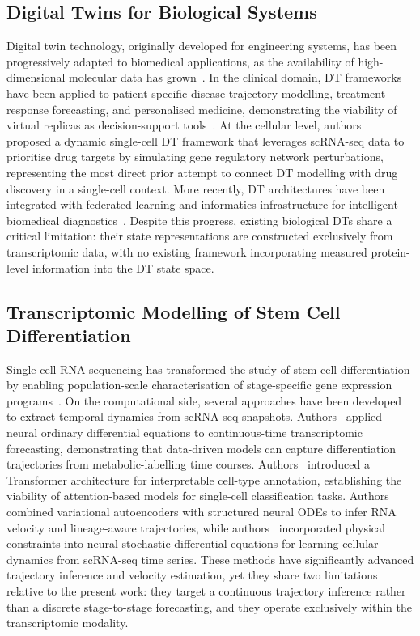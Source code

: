 \documentclass[5p,times,twocolumn]{elsarticle}
\begin{document}
\subsection{\textbf{Digital Twins for Biological Systems}}

Digital twin technology, originally developed for
engineering systems, has been progressively adapted
to biomedical applications, as the availability of
high-dimensional molecular data has
grown~\cite{masison2021modular}.
In the clinical domain, DT frameworks have been
applied to patient-specific disease trajectory
modelling, treatment response forecasting, and
personalised medicine, demonstrating the viability
of virtual replicas as decision-support
tools~\cite{hansen2024transcriptomics}.
At the cellular level, authors~\cite{li2022dynamic}
proposed a dynamic single-cell DT framework
that leverages scRNA-seq data to prioritise
drug targets by simulating gene regulatory
network perturbations, representing the most
direct prior attempt to connect DT modelling
with drug discovery in a single-cell context.
More recently, DT architectures have been
integrated with federated learning and
informatics infrastructure for intelligent
biomedical diagnostics~\cite{qu2023dtqfl}.
Despite this progress, existing biological DTs
share a critical limitation: their state
representations are constructed exclusively from
transcriptomic data, with no existing framework
incorporating measured protein-level information
into the DT state space.

\subsection{\textbf{Transcriptomic Modelling of Stem Cell
Differentiation}}

Single-cell RNA sequencing has transformed the
study of stem cell differentiation by enabling
population-scale characterisation of stage-specific
gene expression programs~\cite{jerber2021population}.
On the computational side, several approaches have
been developed to extract temporal dynamics from
scRNA-seq snapshots.
Authors~\cite{erbe2023transcriptomic} applied neural ordinary
differential equations to continuous-time
transcriptomic forecasting, demonstrating that
data-driven models can capture differentiation
trajectories from metabolic-labelling time courses.
Authors~\cite{chen2023transformer} introduced
a Transformer architecture for interpretable
cell-type annotation, establishing the viability
of attention-based models for single-cell
classification tasks.
Authors~\cite{farrell2023inferring} combined
variational autoencoders with structured neural
ODEs to infer RNA velocity and lineage-aware
trajectories, while authors~\cite{jiang2024physics}
incorporated physical constraints into neural
stochastic differential equations for learning
cellular dynamics from scRNA-seq time series.
These methods have significantly advanced
trajectory inference and velocity estimation,
yet they share two limitations relative to the
present work: they target a continuous trajectory
inference rather than a discrete stage-to-stage
forecasting, and they operate exclusively within
the transcriptomic modality.
\end{document}
